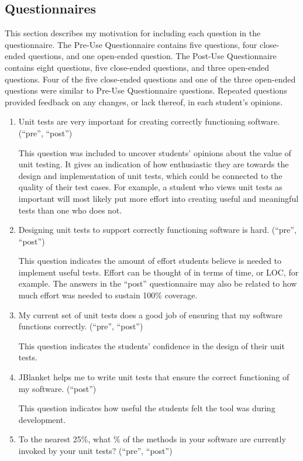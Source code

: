 \subsection{Questionnaires}
This section describes my motivation for including each question in the
questionnaire.  The Pre-Use Questionnaire contains five questions, four
close-ended questions, and one open-ended question.  The Post-Use
Questionnaire contains eight questions, five close-ended questions, and
three open-ended questions.  Four of the five close-ended questions and one
of the three open-ended questions were similar to Pre-Use Questionnaire
questions.  Repeated questions provided feedback on any changes, or lack
thereof, in each student's opinions.
\begin{enumerate}
\item Unit tests are very important for creating correctly functioning
software.  (``pre'', ``post'')

This question was included to uncover students' opinions about the value of
unit testing.  It gives an indication of how enthusiastic they are towards
the design and implementation of unit tests, which could be connected to
the quality of their test cases.  For example, a student who views unit
tests as important will most likely put more effort into creating useful
and meaningful tests than one who does not.

\item Designing unit tests to support correctly functioning software is
hard. (``pre'', ``post'')

This question indicates the amount of effort students believe is needed to
implement useful tests.  Effort can be thought of in terms of time, or LOC,
for example.  The answers in the ``post'' questionnaire may also be related
to how much effort was needed to sustain 100\% coverage.

\item My current set of unit tests does a good job of ensuring that my
software functions correctly. (``pre'', ``post'')

This question indicates the students' confidence in the design of their
unit tests.

\item JBlanket helps me to write unit tests that ensure the correct
functioning of my software. (``post'')

This question indicates how useful the students felt the tool was during
development.

\item To the nearest 25\%, what \% of the methods in your software are
currently invoked by your unit tests? (``pre'', ``post'')


\end{enumerate}
